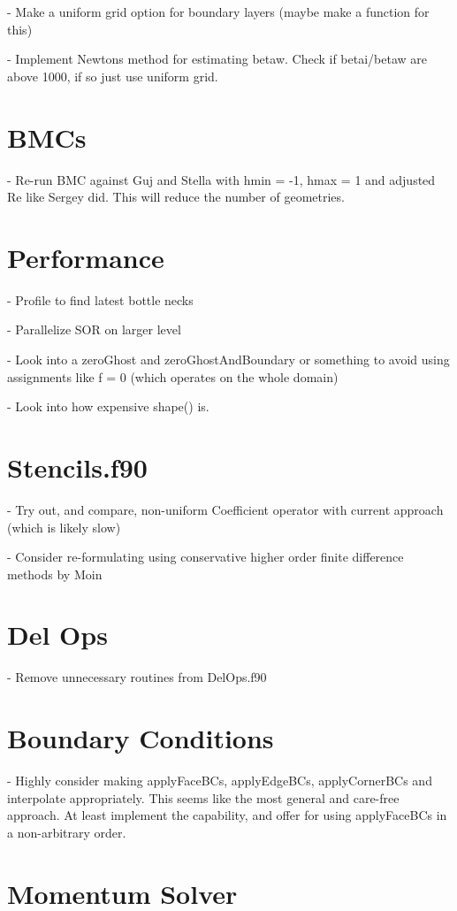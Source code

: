 \documentclass[11pt]{article}
\begin{document}
- Make a uniform grid option for boundary layers (maybe make a function for this)

- Implement Newtons method for estimating betaw. Check if betai/betaw
are above 1000, if so just use uniform grid.


\section{BMCs}

- Re-run BMC against Guj and Stella with hmin = -1, hmax = 1 and adjusted Re like Sergey
  did. This will reduce the number of geometries.

\section{Performance}
- Profile to find latest bottle necks

- Parallelize SOR on larger level

- Look into a zeroGhost and zeroGhostAndBoundary or something to avoid using assignments like f = 0 (which operates on the whole domain)

- Look into how expensive shape() is.


\section{Stencils.f90}
- Try out, and compare, non-uniform Coefficient operator with current approach (which is likely slow)

- Consider re-formulating using conservative higher order finite difference methods by Moin

\section{Del Ops}
- Remove unnecessary routines from DelOps.f90


\section{Boundary Conditions}
- Highly consider making applyFaceBCs, applyEdgeBCs, applyCornerBCs and interpolate appropriately. This seems like the most general and care-free approach. At least implement the capability, and offer for using applyFaceBCs in a non-arbitrary order.

\section{Momentum Solver}
\end{document}
